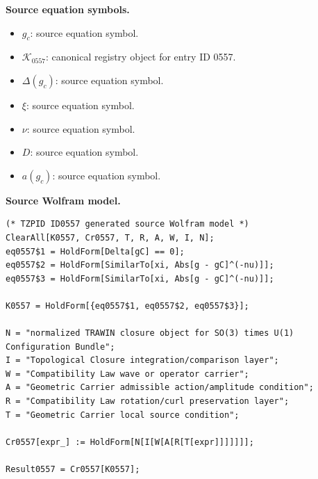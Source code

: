 \begin{minipage}[t]{0.49\linewidth}
\begingroup
\small
\raggedright
\textbf{Source equation symbols.}\par
\begin{itemize}[leftmargin=1.35em,itemsep=1pt,topsep=1pt,parsep=0pt]
    \item $g_c$: source equation symbol.
    \item $\mathcal{K}_{0557}$: canonical registry object for entry ID 0557.
    \item $\Delta(g_c)$: source equation symbol.
    \item $\xi$: source equation symbol.
    \item $\nu$: source equation symbol.
    \item $D$: source equation symbol.
    \item $a(g_c)$: source equation symbol.
\end{itemize}
\endgroup
\end{minipage}\hfill
\begin{minipage}[t]{0.47\linewidth}
\begingroup
\scriptsize
\raggedright
\textbf{Source Wolfram model.}\par
\begin{Verbatim}[fontsize=\tiny,breaklines=true,breakanywhere=true]
(* TZPID ID0557 generated source Wolfram model *)
ClearAll[K0557, Cr0557, T, R, A, W, I, N];
eq0557$1 = HoldForm[Delta[gC] == 0];
eq0557$2 = HoldForm[SimilarTo[xi, Abs[g - gC]^(-nu)]];
eq0557$3 = HoldForm[SimilarTo[xi, Abs[g - gC]^(-nu)]];

K0557 = HoldForm[{eq0557$1, eq0557$2, eq0557$3}];

N = "normalized TRAWIN closure object for SO(3) times U(1) Configuration Bundle";
I = "Topological Closure integration/comparison layer";
W = "Compatibility Law wave or operator carrier";
A = "Geometric Carrier admissible action/amplitude condition";
R = "Compatibility Law rotation/curl preservation layer";
T = "Geometric Carrier local source condition";

Cr0557[expr_] := HoldForm[N[I[W[A[R[T[expr]]]]]]];

Result0557 = Cr0557[K0557];
\end{Verbatim}
\endgroup
\end{minipage}

